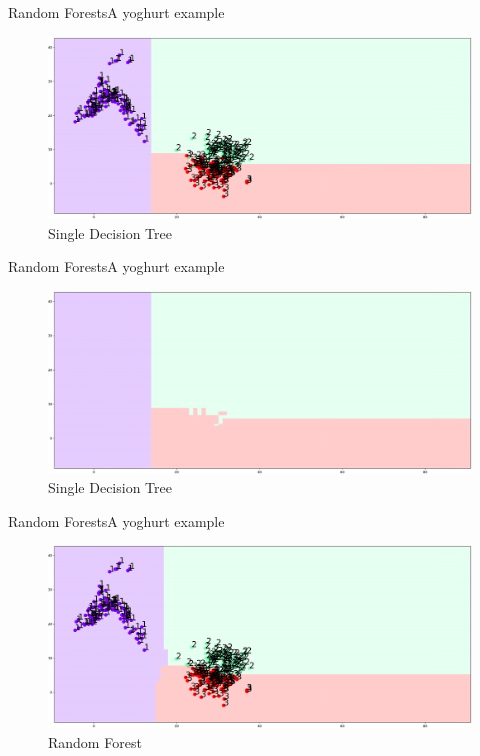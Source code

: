 \documentclass{beamer}
\begin{document}
\begin{frame}{Random Forests}{A yoghurt example}
	\begin{figure}
		\centering
		\includegraphics[width=\textwidth]{decision_boundaries}
		\caption{Single Decision Tree}
	\end{figure}
\end{frame}

\begin{frame}{Random Forests}{A yoghurt example}
	\begin{figure}
		\centering
		\includegraphics[width=\textwidth]{decision_boundaries_nopoints}
		\caption{Single Decision Tree}
	\end{figure}
\end{frame}

\begin{frame}{Random Forests}{A yoghurt example}
	\begin{figure}
		\centering
		\includegraphics[width=\textwidth]{rf}
		\caption{Random Forest}
	\end{figure}
\end{frame}
\end{document}
